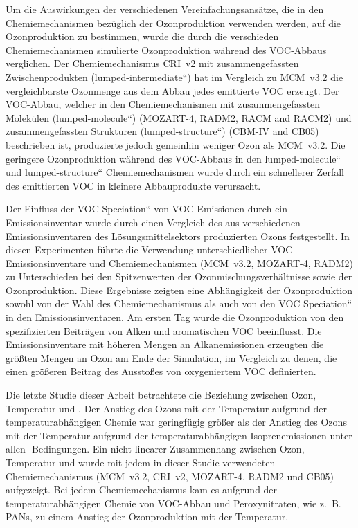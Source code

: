 Um die Auswirkungen der verschiedenen Vereinfachungsansätze, die in den Chemiemechanismen bezüglich der Ozonproduktion verwenden werden, auf die Ozonproduktion zu bestimmen, wurde die durch die verschieden Chemiemechanismen simulierte Ozonproduktion während des VOC-Abbaus verglichen.
Der Chemiemechanismus CRI~v2 mit zusammengefassten Zwischenprodukten (\quotedblbase lumped-intermediate``) hat im Vergleich zu  MCM~v3.2 die vergleichbarste Ozonmenge aus dem Abbau jedes emittierte VOC erzeugt. 
Der VOC-Abbau, welcher in den Chemiemechanismen mit zusammengefassten Molekülen (\quotedblbase lumped-molecule``) (MOZART-4, RADM2, RACM and RACM2) und zusammengefassten Strukturen (\quotedblbase lumped-structure``) (CBM-IV and CB05) beschrieben ist, produzierte jedoch gemeinhin weniger Ozon als MCM~v3.2. 
Die geringere Ozonproduktion während des VOC-Abbaus in den \quotedblbase lumped-molecule`` und \quotedblbase lumped-structure`` Chemiemechanismen wurde durch ein schnellerer Zerfall des emittierten VOC in kleinere Abbauprodukte verursacht.

Der Einfluss der \quotedblbase VOC Speciation`` von VOC-Emissionen durch ein Emissionsinventar wurde durch einen Vergleich des aus verschiedenen Emissionsinventaren des Lösungsmittelsektors produzierten Ozons festgestellt.
In diesen Experimenten führte die Verwendung unterschiedlicher VOC-Emissionsinventare und Chemiemechanismen (MCM~v3.2, MOZART-4, RADM2) zu Unterschieden bei den Spitzenwerten der Ozonmischungsverhältnisse sowie der Ozonproduktion.
Diese Ergebnisse zeigten eine Abhängigkeit der Ozonproduktion sowohl von der Wahl des Chemiemechanismus als auch von den \quotedblbase VOC Speciation`` in den Emissionsinventaren.
Am ersten Tag wurde die Ozonproduktion von den spezifizierten Beiträgen von Alken und aromatischen VOC beeinflusst.
Die Emissionsinventare mit höheren Mengen an Alkanemissionen erzeugten die größten Mengen an Ozon am Ende der Simulation, im Vergleich zu denen, die einen größeren Beitrag des Ausstoßes von oxygeniertem VOC definierten.

Die letzte Studie dieser Arbeit betrachtete die Beziehung zwischen Ozon, Temperatur und .
Der Anstieg des Ozons mit der Temperatur aufgrund der temperaturabhängigen Chemie war geringfügig größer als der Anstieg des Ozons mit der Temperatur aufgrund der temperaturabhängigen Isoprenemissionen unter allen -Bedingungen.
Ein nicht-linearer Zusammenhang zwischen Ozon, Temperatur und  wurde mit jedem in dieser Studie verwendeten Chemiemechanismus (MCM~v3.2, CRI~v2, MOZART-4, RADM2 und CB05) aufgezeigt.
Bei jedem Chemiemechanismus kam es aufgrund der temperaturabhängigen Chemie von VOC-Abbau und Peroxynitraten, wie z.~B. PANs, zu einem Anstieg der Ozonproduktion mit der Temperatur. 

